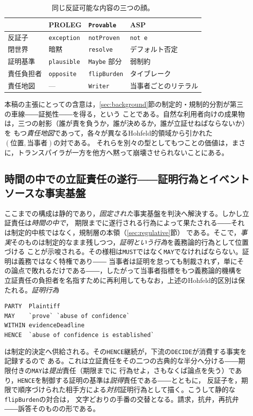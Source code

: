 \documentclass[11pt,a4paper]{ltjsarticle}
\newcommand{\code}[1]{\texttt{\small #1}}
\begin{document}
\begin{table}[t]
\caption{同じ反証可能な内容の三つの顔。}
\label{tab:correspondence}
\small
\begin{tabular}{@{}llll@{}}
\toprule
 & \textbf{PROLEG} & \textbf{\texttt{Provable}} & \textbf{ASP} \\
\midrule
反証子     & \code{exception} & \code{notProven}  & \code{not e} \\
閉世界     & 暗黙             & \code{resolve}    & デフォルト否定 \\
証明基準   & \code{plausible} & \code{Maybe} 部分 & 弱制約 \\
責任負担者 & \code{opposite}  & \code{flipBurden} & タイブレーク \\
責任地図   & ---              & \code{Writer}     & 当事者ごとのリテラル \\
\bottomrule
\end{tabular}
\end{table}

本稿の主張にとっての含意は，\ref{sec:background}節の制定的・規制的分割が第三の車線――証拠性――を得る，という
ことである。自然な利用者向けの成果物は，三つの射影（誰が責を負うか，誰が決めるか，誰が立証せねばならないか）を
もつ\emph{責任地図}であって，各々が異なるHohfeld的領域から引かれた$(\textit{位置},\textit{当事者})$の対である。
それらを別々の型としてもつことの価値は，まさに，トランスパイラが一方を他方へ黙って崩壊させられないことにある。

\subsection{時間の中での立証責任の遂行――証明行為とイベントソースな事実基盤}\label{app:proofaction}
ここまでの構成は静的であり，\emph{固定された}事実基盤を判決へ解決する。しかし立証責任は\emph{時間の中で}，
期限までに遂行される行為によって果たされる――それは制定的中核ではなく，規制層の本領（\ref{sec:regulative}節）
である。そこで，\emph{事実}そのものは制定的なまま残しつつ，\emph{証明という行為}を義務論的行為として位置づける
ことが示唆される。その様相は\code{MUST}ではなく\code{MAY}でなければならない。証明は義務ではなく特権であり――
当事者は証明を怠っても制裁されず，単にその論点で敗れるだけである――，したがって当事者指標をもつ義務論的機構を
立証責任の負担者を名指すために再利用してもなお，上述のHohfeld的区別は保たれる。\emph{証明行為}
\begin{lstlisting}
PARTY  Plaintiff
MAY    `prove` `abuse of confidence`
WITHIN evidenceDeadline
HENCE  `abuse of confidence is established`
\end{lstlisting}
\noindent は制定的決定へ供給される。その\code{HENCE}継続が，下流の\code{DECIDE}が消費する事実を記録するので
ある。これは立証責任をその二つの古典的な半分へ分ける――期限付きの\code{MAY}は\emph{提出}責任（期限までに
行為せよ，さもなくば論点を失う）であり，\code{HENCE}を制御する証明の基準は\emph{説得}責任である――とともに，
反証子を，期限で順序づけられた相手方による\emph{対抗}証明行為として描く。こうして静的な\code{flipBurden}の対合は，
文字どおりの手番の交替となる。請求，抗弁，再抗弁――訴答そのものの形である。
\end{document}
